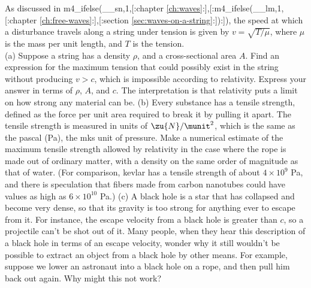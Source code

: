 As discussed in
m4_ifelse(__sn,1,[:chapter \ref{ch:waves}:],[:m4_ifelse(__lm,1,[:chapter \ref{ch:free-waves}:],[:section \ref{sec:waves-on-a-string}:]):]), the speed at which a disturbance travels along
a string under tension is given by $v=\sqrt{T/\mu}$, where $\mu$ is the mass per unit
length, and $T$ is the tension.\\
 (a) Suppose a string has a density $\rho$, and a cross-sectional
area $A$. Find an expression for the maximum tension that could possibly exist in the string
without producing $v>c$, which is impossible according to relativity. Express your answer in
terms of $\rho$, $A$, and $c$. The interpretation is that relativity puts a limit on how
strong any material can be.\answercheck\hwendpart
(b) Every substance has a tensile strength, defined as the force
per unit area required to break it by pulling it apart. The tensile strength is measured in
units of $\zu{N}/\munit^2$, which is the same as the pascal (Pa), the mks unit of pressure.
Make a numerical estimate of the maximum tensile strength allowed by relativity in the case where
the rope is made out of ordinary matter, with a density on the same order of magnitude as
that of water. (For comparison, kevlar has a tensile strength of about $4\times10^9$ Pa,
and there is speculation that fibers made from carbon nanotubes could have
values as high as  $6\times10^{10}$ Pa.)\answercheck\hwendpart
(c) A black hole is a star that has collapsed and become very dense, so that
its gravity is too strong for anything ever to escape from it. For instance, the escape
velocity from a black hole is greater than $c$, so a projectile can't be shot out of it.
Many people, when they hear this description of a black hole in terms of an escape velocity,
wonder why it still wouldn't be possible to extract an object from a black
hole by other means.
For example, suppose we lower an astronaut into a black hole on a rope, and then pull him
back out again. Why might this not work?\hwendpart
